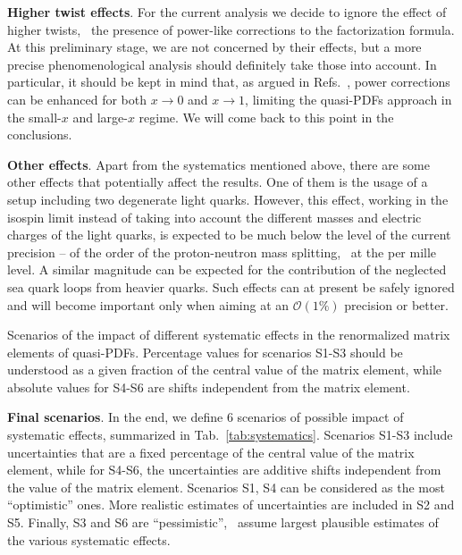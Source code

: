 \textbf{Higher twist effects}. For the current analysis we decide to ignore the
effect of higher twists, \ie\ the presence of power-like corrections to the
factorization formula. At this preliminary stage, we are not concerned by their
effects, but a more precise phenomenological analysis should definitely take
those into account. In particular, it should be kept in mind that, as argued in Refs.~\cite{Izubuchi:2018srq},
power corrections can be enhanced for both $x\rightarrow 0$ and $x\rightarrow 1$, limiting
the quasi-PDFs approach in the small-$x$ and large-$x$ regime. We will come back to this point in the conclusions. 

\textbf{Other effects}. Apart from the systematics mentioned above, there are
some other effects that potentially affect the results. One of them is the usage
of a setup including two degenerate light quarks. However, this effect, working
in the isospin limit instead of taking into account the different masses and
electric charges of the light quarks, is expected to be much below the level of
the current precision -- of the order of the proton-neutron mass splitting, \ie\
at the per mille level. A similar magnitude can be expected for the contribution
of the neglected sea quark loops from heavier quarks. Such effects can at
present be safely ignored and will become important only when aiming at an
$\mathcal{O}(1\%)$ precision or better.


\begin{table}[!t]
    \centering
    \scriptsize
    \renewcommand{\arraystretch}{1.90}
    
    \vspace{0.3cm}
    \caption{Scenarios of the impact of different systematic effects 
    in the renormalized matrix elements of quasi-PDFs. Percentage values for scenarios 
    S1-S3 should be understood as a given fraction of the central value of the matrix element, 
    while absolute values for S4-S6 are shifts independent from the matrix element.}
    \label{tab:systematics}
\end{table}


\textbf{Final scenarios}. In the end, we define 6 scenarios of possible impact
of systematic effects, summarized in Tab.~\ref{tab:systematics}. Scenarios S1-S3
include uncer\-tain\-ties that are a fixed percentage of the central value of
the matrix element, while for S4-S6, the uncertainties are additive shifts
independent from the value of the matrix element. Scenarios S1, S4 can be
considered as the most ``optimistic'' ones. More realistic estimates of
uncertainties are included in S2 and S5. Finally, S3 and S6 are ``pessimistic'',
\ie\ assume largest plausible estimates of the various systematic effects.


